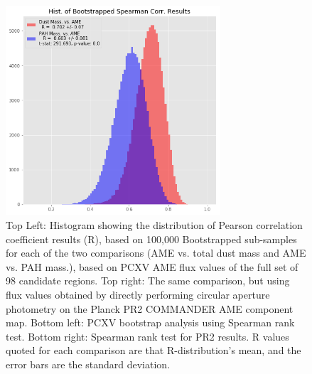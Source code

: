 \documentclass[preprint2,longabstract]{aastex}
\begin{document}
\begin{figure}
\includegraphics[width=80mm]{../Plots/AMEregs_bootstrap_mass_spearman_PCXV.png}
\centering
\caption{Top Left: Histogram showing the distribution of Pearson correlation coefficient results (R), based on 100,000 Bootstrapped sub-samples for each of the two comparisons (AME vs. total dust mass and AME vs. PAH mass.), based on PCXV AME flux values of the full set of 98 candidate regions. Top right:  The same comparison, but using flux values obtained by directly performing circular aperture photometry on the Planck PR2 COMMANDER AME component map. Bottom left: PCXV bootstrap analysis using Spearman rank test. Bottom right: Spearman rank test for PR2 results. R values quoted for each comparison are that R-distribution's mean, and the error bars are the standard deviation. }
\end{figure}
\end{document}
